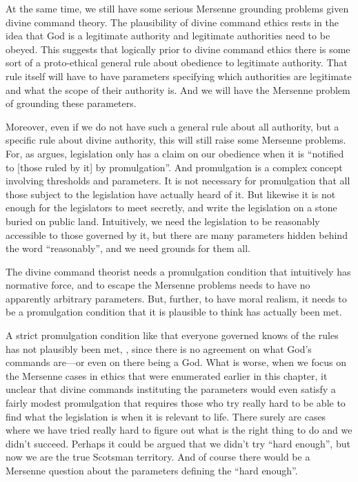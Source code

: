At the same time, we still have some serious Mersenne grounding problems given divine command theory. The plausibility of divine command ethics rests in
the idea that God is a legitimate authority and legitimate authorities need to be obeyed. This suggests that logically prior
to divine command ethics there is some sort of a proto-ethical general rule about obedience to legitimate authority. That 
rule itself will have to have parameters specifying which authorities are legitimate and what the scope of their authority is. 
And we will have the Mersenne problem of grounding these parameters.

Moreover, even if we do not have such a general rule about all authority, but a specific rule about divine authority, this
will still raise some Mersenne problems. For, as  argues, legislation only has a claim on our obedience when it 
is ``notified to [those ruled by it] by promulgation''. And promulgation is a complex concept involving thresholds and parameters. It is not necessary
for promulgation that all those subject to the legislation have actually heard of it. But likewise it is not enough for the legislators to
meet secretly, and write the legislation on a stone  buried on public land. Intuitively, we need the legislation to be 
reasonably accessible to those governed by it, but there are many parameters hidden behind the word ``reasonably'', and 
we need grounds for them all.

The divine command theorist needs a promulgation condition that intuitively has normative force, and to escape the
Mersenne problems needs to have no apparently arbitrary parameters. But, further, to have moral realism, it needs to
be a promulgation condition that it is plausible to think has actually been met.

A strict promulgation condition like that everyone governed knows of the rules has not plausibly been met, , since
there is no agreement on what God's commands are---or even on there being a God.
What is worse, when we focus on the Mersenne cases in ethics that were enumerated earlier in this chapter, it unclear that divine commands instituting the parameters
would even satisfy a fairly modest promulgation that requires those who try really hard to be able to find what the legislation 
is when it is relevant to life. There surely are cases where we have tried really hard to figure out what is the right thing
to do and we didn't succeed. Perhaps it could be argued that we didn't try ``hard enough'', but now we are the true
Scotsman territory. And of course there would be a Mersenne question about the parameters defining the ``hard enough''.

